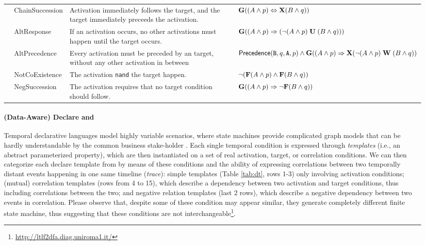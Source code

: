 \begin{table}
{\begin{tabular}{c|l|p{9cm}|l}
	 & \textsf{ChainSuccession}  & Activation immediately follows the target, and the target immediately preceeds the activation. & $\mathbf{G}((A\wedge p)\Leftrightarrow\mathbf{X}(B\wedge q))$\\
	 & \textsf{AltResponse}  & If an activation occurs, no other activations must happen until the target occurs.  & $\mathbf{G}((A\wedge p)\Rightarrow({\neg(A\wedge p)}\;\mathbf{U}\;{(B\wedge q)}))$\\
	 & \textsf{AltPrecedence}  & Every activation must be preceded by an target, without any other
	 activation in between &   $\textsf{Precedence}(\texttt{B},q,\texttt{A},p)\wedge \mathbf{G}((A\wedge p)\Rightarrow \mathbf{X}({\neg(A\wedge p)}\;\mathbf{W}\;{(B\wedge q)})$\\
	 \midrule
	 
	 \parbox[t]{2mm}{} & \textsf{NotCoExistence} & The activation \texttt{nand} the target happen.&  $\neg(\mathbf{F}(A\wedge p)\wedge\mathbf{F}(B\wedge q))$\\
	 & \textsf{NegSuccession} & The activation requires that no target condition should follow.& $\mathbf{G}((A\wedge p)\Rightarrow \neg\mathbf{F}(B\wedge q))$ \\
	 \bottomrule
\end{tabular}}
\end{table}



\paragraph*{(Data-Aware) Declare and \LTLf}\label{sec:DAD} Temporal declarative languages model highly variable scenarios, where state machines provide complicated graph models that can be hardly understandable by the common business stake-holder \cite{PichlerWZPMR11}. Each single temporal condition is expressed through \textit{templates} (i.e., an abstract parameterized property), which are then instantiated on a set of real activation, target, or correlation conditions. We can then categorize each declare template from \cite{Li2020} by means of these conditions and the ability of expressing correlations between two temporally distant events happening in one same timeline (\textit{trace}): simple
 templates (Table \ref{tab:dt}, rows 1-3) only involving activation conditions; (mutual)
 correlation templates (rows from 4 to 15), which describe a dependency between two
activation and target conditions, thus including correlations between the two; and negative relation templates (last 2 rows), which describe a negative
dependency between two events in correlation. Please observe that, despite some of these condition may appear similar, they generate completely different finite state machine, thus suggesting that these conditions are not interchangeable\footnote{\url{http://ltlf2dfa.diag.uniroma1.it/}}. 

